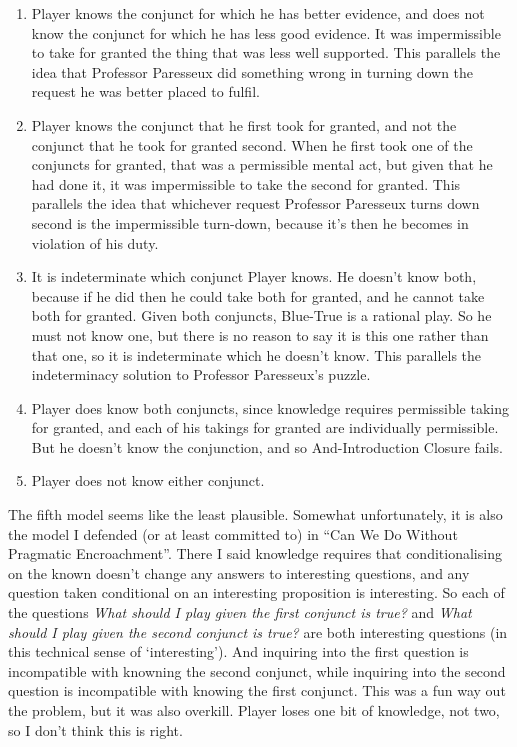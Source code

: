 \documentclass[11pt,]{book}
\providecommand{\tightlist}{%
  \setlength{\itemsep}{0pt}\setlength{\parskip}{0pt}}
\begin{document}
\begin{enumerate}
\def\labelenumi{\arabic{enumi}.}
\tightlist
\item
  Player knows the conjunct for which he has better evidence, and does not know the conjunct for which he has less good evidence. It was impermissible to take for granted the thing that was less well supported. This parallels the idea that Professor Paresseux did something wrong in turning down the request he was better placed to fulfil.
\item
  Player knows the conjunct that he first took for granted, and not the conjunct that he took for granted second. When he first took one of the conjuncts for granted, that was a permissible mental act, but given that he had done it, it was impermissible to take the second for granted. This parallels the idea that whichever request Professor Paresseux turns down second is the impermissible turn-down, because it's then he becomes in violation of his duty.
\item
  It is indeterminate which conjunct Player knows. He doesn't know both, because if he did then he could take both for granted, and he cannot take both for granted. Given both conjuncts, Blue-True is a rational play. So he must not know one, but there is no reason to say it is this one rather than that one, so it is indeterminate which he doesn't know. This parallels the indeterminacy solution to Professor Paresseux's puzzle.
\item
  Player does know both conjuncts, since knowledge requires permissible taking for granted, and each of his takings for granted are individually permissible. But he doesn't know the conjunction, and so And-Introduction Closure fails.
\item
  Player does not know either conjunct.
\end{enumerate}

The fifth model seems like the least plausible. Somewhat unfortunately, it is also the model I defended (or at least committed to) in ``Can We Do Without Pragmatic Encroachment''. There I said knowledge requires that conditionalising on the known doesn't change any answers to interesting questions, and any question taken conditional on an interesting proposition is interesting. So each of the questions \emph{What should I play given the first conjunct is true?} and \emph{What should I play given the second conjunct is true?} are both interesting questions (in this technical sense of `interesting'). And inquiring into the first question is incompatible with knowning the second conjunct, while inquiring into the second question is incompatible with knowing the first conjunct. This was a fun way out the problem, but it was also overkill. Player loses one bit of knowledge, not two, so I don't think this is right.
\end{document}
